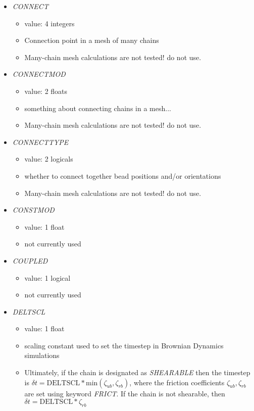 \documentclass[12pt]{article}
\begin{document}
\begin{itemize}
\begin{itemize}
  \end{itemize}
%
\item {\it CONNECT}
  \begin{itemize}
    \item  value: 4 integers
    \item Connection point in a mesh of many chains
    \item {\color{red} Many-chain mesh calculations are not tested! do not use.}
  \end{itemize}
%
\item {\it CONNECTMOD}
  \begin{itemize}
    \item  value: 2 floats
    \item something about connecting chains in a mesh...
    \item {\color{red} Many-chain mesh calculations are not tested! do not use.}
  \end{itemize}
%
\item {\it CONNECTTYPE}
  \begin{itemize}
    \item  value: 2 logicals
    \item whether to connect together bead positions and/or orientations
    \item {\color{red} Many-chain mesh calculations are not tested! do not use.}
  \end{itemize}
%
\item {\it CONSTMOD}
  \begin{itemize}
    \item  value: 1 float
    \item not currently used
  \end{itemize}
%
\item {\it COUPLED}
  \begin{itemize}
    \item  value: 1 logical
    \item not currently used
  \end{itemize}
%
\item {\it DELTSCL}
  \begin{itemize}
    \item  value: 1 float
    \item scaling constant used to set the timestep in Brownian Dynamics simulations
    \item Ultimately, if the chain is designated as {\it SHEARABLE} then the timestep is $\delta t = \text{DELTSCL} * \text{min}(\zeta_{ub},\zeta_{rb})$, where the friction coefficients $\zeta_{ub},\zeta_{rb}$ are set using keyword {\it FRICT}. If the chain is not shearable, then $\delta t = \text{DELTSCL} * \zeta_{rb}$

\end{itemize}
\end{itemize}
\end{document}
